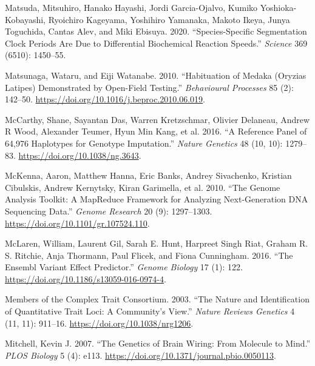\documentclass[
]{book}
\newlength{\cslhangindent}
\newlength{\cslentryspacingunit} %
\newenvironment{CSLReferences}[2] %
 {%
  \setlength{\parindent}{0pt}
  \ifodd #1
  \let\oldpar\par
  \def\par{\hangindent=\cslhangindent\oldpar}
  \fi
  \setlength{\parskip}{#2\cslentryspacingunit}
 }%
 {}
\begin{document}
\begin{CSLReferences}{1}{0}
\leavevmode{}%
Matsuda, Mitsuhiro, Hanako Hayashi, Jordi Garcia-Ojalvo, Kumiko Yoshioka-Kobayashi, Ryoichiro Kageyama, Yoshihiro Yamanaka, Makoto Ikeya, Junya Toguchida, Cantas Alev, and Miki Ebisuya. 2020. {``Species-Specific Segmentation Clock Periods Are Due to Differential Biochemical Reaction Speeds.''} \emph{Science} 369 (6510): 1450--55.

\leavevmode{}%
Matsunaga, Wataru, and Eiji Watanabe. 2010. {``Habituation of Medaka ({Oryzias} Latipes) Demonstrated by Open-Field Testing.''} \emph{Behavioural Processes} 85 (2): 142--50. \url{https://doi.org/10.1016/j.beproc.2010.06.019}.

\leavevmode{}%
McCarthy, Shane, Sayantan Das, Warren Kretzschmar, Olivier Delaneau, Andrew R Wood, Alexander Teumer, Hyun Min Kang, et al. 2016. {``A Reference Panel of 64,976 Haplotypes for Genotype Imputation.''} \emph{Nature Genetics} 48 (10, 10): 1279--83. \url{https://doi.org/10.1038/ng.3643}.

\leavevmode{}%
McKenna, Aaron, Matthew Hanna, Eric Banks, Andrey Sivachenko, Kristian Cibulskis, Andrew Kernytsky, Kiran Garimella, et al. 2010. {``The {Genome Analysis Toolkit}: {A MapReduce} Framework for Analyzing Next-Generation {DNA} Sequencing Data.''} \emph{Genome Research} 20 (9): 1297--1303. \url{https://doi.org/10.1101/gr.107524.110}.

\leavevmode{}%
McLaren, William, Laurent Gil, Sarah E. Hunt, Harpreet Singh Riat, Graham R. S. Ritchie, Anja Thormann, Paul Flicek, and Fiona Cunningham. 2016. {``The {Ensembl Variant Effect Predictor}.''} \emph{Genome Biology} 17 (1): 122. \url{https://doi.org/10.1186/s13059-016-0974-4}.

\leavevmode{}%
Members of the Complex Trait Consortium. 2003. {``The Nature and Identification of Quantitative Trait Loci: A Community's View.''} \emph{Nature Reviews Genetics} 4 (11, 11): 911--16. \url{https://doi.org/10.1038/nrg1206}.

\leavevmode{}%
Mitchell, Kevin J. 2007. {``The {Genetics} of {Brain Wiring}: {From Molecule} to {Mind}.''} \emph{PLOS Biology} 5 (4): e113. \url{https://doi.org/10.1371/journal.pbio.0050113}.


\end{CSLReferences}
\end{document}
